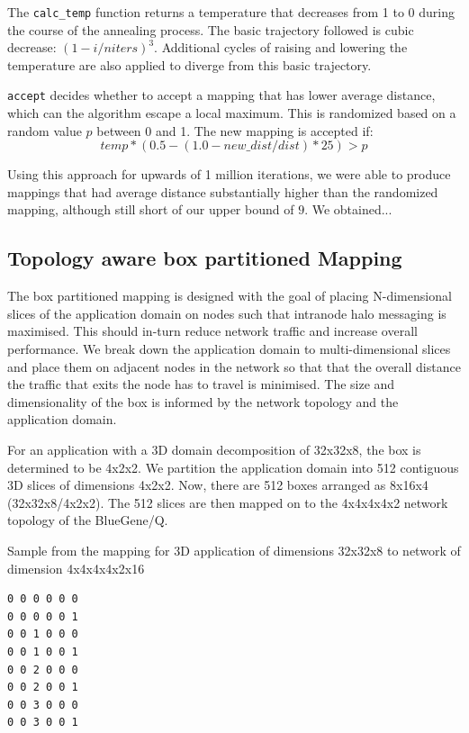 \documentclass{acm_proc_article-sp}
\begin{document}
The \texttt{calc\_temp} function returns a temperature that
decreases from 1 to 0 during the course of the annealing process.
The basic trajectory followed is cubic decrease: $(1 - i/niters)^3$.
Additional cycles of raising and lowering the temperature are also
applied to diverge from this basic trajectory.

\texttt{accept} decides whether to accept a mapping that has lower
average distance, which can the algorithm escape a local maximum.
This is randomized based on a random value $p$ between 0 and 1.
The new mapping is accepted if:
$$temp * (0.5 - (1.0 - new\_dist/dist) * 25) > p$$

Using this approach for upwards of 1 million iterations,
we were able to produce mappings that had average distance substantially
higher than the randomized mapping, although still short of our upper
bound of $9$.  We obtained...  

\subsection{Topology aware box partitioned Mapping}

The box partitioned mapping is designed with the goal of placing N-dimensional slices of the application domain on nodes such that
intranode halo messaging is maximised. This should in-turn reduce network traffic and increase overall performance.
We break down the application domain to multi-dimensional slices and place them on adjacent nodes in the network so that that the
overall distance the traffic that exits the node has to travel is minimised. The size and dimensionality of the box is informed
by the network topology and the application domain.

For an application with a 3D domain decomposition of 32x32x8, the box is determined to be 4x2x2. We partition the application domain
into 512 contiguous 3D slices of dimensions 4x2x2. Now, there are 512 boxes arranged as 8x16x4 (32x32x8/4x2x2).
The 512 slices are then mapped on to the 4x4x4x4x2 network topology of the BlueGene/Q.

Sample from the mapping for 3D application of dimensions 32x32x8 to network of dimension 4x4x4x4x2x16
\begin{lstlisting}[frame=lines, basicstyle=\ttfamily,columns=fixed]
0 0 0 0 0 0
0 0 0 0 0 1
0 0 1 0 0 0
0 0 1 0 0 1
0 0 2 0 0 0
0 0 2 0 0 1
0 0 3 0 0 0
0 0 3 0 0 1
\end{lstlisting}
\end{document}
